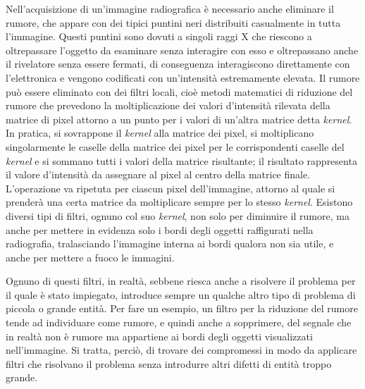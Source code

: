 \documentclass{report}
\numberwithin{equation}{section}
\numberwithin{figure}{section}
\begin{document}
Nell'acquisizione di un'immagine radiografica è necessario anche eliminare il rumore, che appare con dei tipici puntini neri distribuiti casualmente in tutta l'immagine. Questi puntini sono dovuti a singoli raggi X che riescono a oltrepassare l'oggetto da esaminare senza interagire con esso e oltrepassano anche il rivelatore senza essere fermati, di conseguenza interagiscono direttamente con l'elettronica e vengono codificati con un'intensità estremamente elevata. Il rumore può essere eliminato con dei filtri locali, cioè metodi matematici di riduzione del rumore che prevedono la moltiplicazione dei valori d'intensità rilevata della matrice di pixel attorno a un punto per i valori di un'altra matrice detta \textit{kernel}. In pratica, si sovrappone il \textit{kernel} alla matrice dei pixel, si moltiplicano singolarmente le caselle della matrice dei pixel per le corrispondenti caselle del \textit{kernel} e si sommano tutti i valori della matrice risultante; il risultato rappresenta il valore d'intensità da assegnare al pixel al centro della matrice finale. L'operazione va ripetuta per ciascun pixel dell'immagine, attorno al quale si prenderà una certa matrice da moltiplicare sempre per lo stesso \textit{kernel}. Esistono diversi tipi di filtri, ognuno col suo \textit{kernel}, non solo per diminuire il rumore, ma anche per mettere in evidenza solo i bordi degli oggetti raffigurati nella radiografia, tralasciando l'immagine interna ai bordi qualora non sia utile, e anche per mettere a fuoco le immagini.

Ognuno di questi filtri, in realtà, sebbene riesca anche a risolvere il problema per il quale è stato impiegato, introduce sempre un qualche altro tipo di problema di piccola o grande entità. Per fare un esempio, un filtro per la riduzione del rumore tende ad individuare come rumore, e quindi anche a sopprimere, del segnale che in realtà non è rumore ma appartiene ai bordi degli oggetti visualizzati nell'immagine. Si tratta, perciò, di trovare dei compromessi in modo da applicare filtri che risolvano il problema senza introdurre altri difetti di entità troppo grande.
\end{document}
